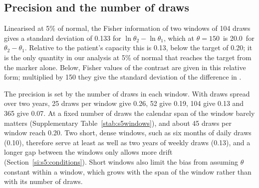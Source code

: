 \subsection{Precision and the number of draws}
\label{si:s5:precision}

Linearised at 5\% of normal, the Fisher information of two windows of 104 draws gives a
standard deviation of 0.133 for $\ln\theta_2-\ln\theta_1$, which at $\theta=150$\um\ is 20.0\um\
for $\theta_2-\theta_1$. Relative to the patient's capacity this is 0.13, below the target of
0.20; it is the only quantity in our analysis at 5\% of normal that reaches the target from the
marker alone. Below, Fisher values of the contrast are given in this relative form; multiplied by
150 they give the standard deviation of the difference in \um.

The precision is set by the number of draws in each window. With draws spread over two years, 25
draws per window give 0.26, 52 give 0.19, 104 give 0.13 and 365 give 0.07. At a fixed number of
draws the calendar span of the window barely matters (Supplementary Table~\ref{stab:s5windows}),
and about 45 draws per window reach 0.20. Two short, dense windows, such as six months of daily
draws (0.10), therefore serve at least as well as two years of weekly draws (0.13), and a longer
gap between the windows only allows more drift (Section~\ref{si:s5:conditions}). Short windows also limit the
bias from assuming $\theta$ constant within a window, which grows with the span of the window
rather than with its number of draws.

